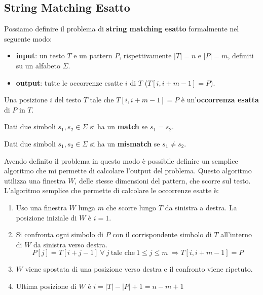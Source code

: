 \subsection{String Matching Esatto}
Possiamo definire il problema di \textbf{string matching esatto} formalmente nel
seguente modo:
\begin{itemize}
    \item \textbf{input}: un testo $T$ e un pattern $P$, rispettivamente
          $|T|=n$ e $|P|=m$, definiti su un alfabeto $\Sigma$.
    \item \textbf{output}: tutte le occorrenze esatte $i$ di $T$ ($T[i,i+m-1]=P$).
\end{itemize}
\begin{definizione}
    Una posizione $i$ del testo $T$ tale che $T[i, i + m - 1] = P$ è
    un'\textbf{occorrenza esatta} di $P$ in $T$.
\end{definizione}
\begin{definizione}
    Dati due simboli $s_1, s_2 \in \Sigma$ si ha un \textbf{match} se $s_1 = s_2$.
\end{definizione}
\begin{definizione}
    Dati due simboli $s_1, s_2 \in \Sigma$ si ha un \textbf{mismatch} se $s_1
        \neq s_2$.
\end{definizione}
Avendo definito il problema in questo modo è possibile definire un semplice
algoritmo che mi permette di calcolare l'output del problema. Questo algoritmo
utilizza una finestra $W$, delle stesse dimensioni del pattern, che scorre sul
testo. L'algoritmo semplice che permette di calcolare le occorrenze esatte è:
\begin{enumerate}
    \item Uso una finestra $W$ lunga $m$ che scorre lungo $T$ da sinistra a
          destra. La posizione iniziale di $W$ è $i = 1$.
    \item Si confronta ogni simbolo di $P$ con il corrispondente simbolo di $T$
          all'interno di $W$ da sinistra verso destra.
          \begin{equation}
              P[j] = T[i + j - 1] \ \forall \ j \ \text{tale che} \ 1 \leq j
              \leq m \ \Rightarrow T[i, i + m - 1] = P
          \end{equation}
    \item $W$ viene spostata di una posizione verso destra e il confronto viene
          ripetuto.
    \item Ultima posizione di $W$ è $i = |T| - |P| + 1 = n - m + 1$
\end{enumerate}
